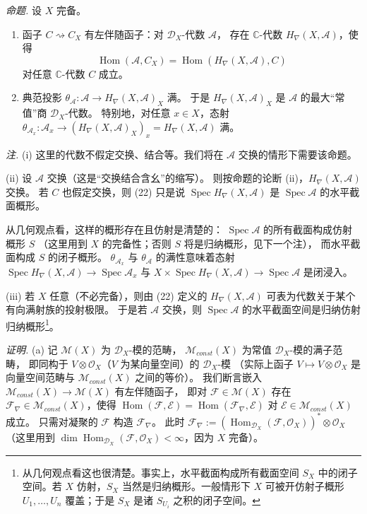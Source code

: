 \emph{命题.} 设 $X$ 完备。
\begin{enumerate}[label=(\roman*),leftmargin=2.2em]
\item 函子 $C\rightsquigarrow C_X$ 有左伴随函子：对 $\mathcal{D}_X$-代数 $\mathcal{A}$，
  存在 $\mathbb{C}$-代数 $H_\nabla(X,\mathcal{A})$，使得
  \begin{equation}\tag{22}
  \operatorname{Hom}(\mathcal{A},C_X)=\operatorname{Hom}(H_\nabla(X,\mathcal{A}),C)
  \end{equation}
  对任意 $\mathbb{C}$-代数 $C$ 成立。
\item 典范投影 $\theta_{\mathcal{A}}: \mathcal{A}\to H_\nabla(X,\mathcal{A})_X$ 满。
  于是 $H_\nabla(X,\mathcal{A})_X$ 是 $\mathcal{A}$ 的最大“常值”商 $\mathcal{D}_X$-代数。
  特别地，对任意 $x\in X$，态射
  $\theta_{\mathcal{A}_x}: \mathcal{A}_x\to(H_\nabla(X,\mathcal{A})_X)_x=H_\nabla(X,\mathcal{A})$ 满。
\end{enumerate}

\emph{注.} (i) 这里的代数不假定交换、结合等。我们将在 $\mathcal{A}$ 交换的情形下需要该命题。

(ii) 设 $\mathcal{A}$ 交换（这是“交换结合含幺”的缩写）。
则按命题的论断 (ii)，$H_\nabla(X,\mathcal{A})$ 交换。
若 $C$ 也假定交换，则 (22) 只是说
$\operatorname{Spec} H_\nabla(X,\mathcal{A})$ 是 $\operatorname{Spec}\mathcal{A}$ 的水平截面概形。

从几何观点看，这样的概形存在且仿射是清楚的：
$\operatorname{Spec}\mathcal{A}$ 的所有截面构成仿射概形 $S$
（这里用到 $X$ 的完备性；否则 $S$ 将是归纳概形，见下一个注），
而水平截面构成 $S$ 的闭子概形。
$\theta_{\mathcal{A}_x}$ 与 $\theta_{\mathcal{A}}$ 的满性意味着态射
$\operatorname{Spec} H_\nabla(X,\mathcal{A})\to\operatorname{Spec}\mathcal{A}_x$
与 $X\times\operatorname{Spec} H_\nabla(X,\mathcal{A})\to\operatorname{Spec}\mathcal{A}$ 是闭浸入。

(iii) 若 $X$ 任意（不必完备），则由 (22) 定义的 $H_\nabla(X,\mathcal{A})$
可表为代数关于某个有向满射族的投射极限。
于是若 $\mathcal{A}$ 交换，则 $\operatorname{Spec}\mathcal{A}$ 的水平截面空间是归纳仿射归纳概形\footnote{从几何观点看这也很清楚。事实上，水平截面构成所有截面空间 $S_X$ 中的闭子空间。若 $X$ 仿射，$S_X$ 当然是归纳概形。一般情形下 $X$ 可被开仿射子概形 $U_1,\dots,U_n$ 覆盖；于是 $S_X$ 是诸 $S_{U_i}$ 之积的闭子空间。}。

\emph{证明.} (a) 记 $\mathcal{M}(X)$ 为 $\mathcal{D}_X$-模的范畴，
$\mathcal{M}_{const}(X)$ 为常值 $\mathcal{D}_X$-模的满子范畴，
即同构于 $V\otimes\mathcal{O}_X$（$V$ 为某向量空间）的 $\mathcal{D}_X$-模
（实际上函子 $V\mapsto V\otimes\mathcal{O}_X$ 是向量空间范畴与 $\mathcal{M}_{const}(X)$ 之间的等价）。
我们断言嵌入 $\mathcal{M}_{const}(X)\to\mathcal{M}(X)$ 有左伴随函子，
即对 $\mathcal{F}\in\mathcal{M}(X)$ 存在 $\mathcal{F}_\nabla\in\mathcal{M}_{const}(X)$，使得
$\operatorname{Hom}(\mathcal{F},\mathcal{E})=\operatorname{Hom}(\mathcal{F}_\nabla,\mathcal{E})$
对 $\mathcal{E}\in\mathcal{M}_{const}(X)$ 成立。
只需对凝聚的 $\mathcal{F}$ 构造 $\mathcal{F}_\nabla$。
此时 $\mathcal{F}_\nabla:=(\operatorname{Hom}_{\mathcal{D}_X}(\mathcal{F},\mathcal{O}_X))^*\otimes\mathcal{O}_X$
（这里用到 $\dim\operatorname{Hom}_{\mathcal{D}_X}(\mathcal{F},\mathcal{O}_X)<\infty$，因为 $X$ 完备）。

